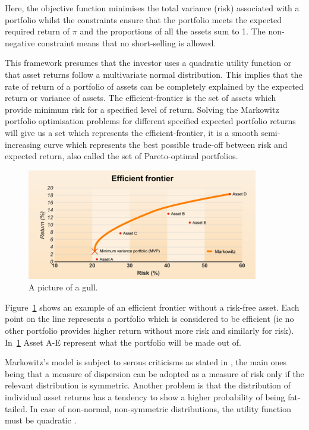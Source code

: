 \documentclass{pdfmx4020}
\begin{document}
    Here, the objective function minimises the total variance (risk) associated with a portfolio whilst the constraints ensure that the portfolio meets the expected required return of $\pi$ and the proportions of all the assets sum to 1. The non-negative constraint means that no short-selling is allowed. 

    This framework presumes that the investor uses a quadratic utility function or that asset returns follow a multivariate normal distribution. This implies that the rate of return of a portfolio of assets can be completely explained by the expected return or variance of assets. The efficient-frontier is the set of assets which provide minimum risk for a specified level of return. Solving the Markowitz portfolio optimisation problems for different specified expected portfolio returns will give us a set which represents the efficient-frontier, it is a smooth semi-increasing curve which represents the best possible trade-off between risk and expected return, also called the set of Pareto-optimal portfolios. 

    \begin{figure}[H]
      \centering
        \includegraphics[width=0.9\textwidth]{efficient_frontier}
      \caption{A picture of a gull.}
      \label{efficient_frontier}
    \end{figure}

    Figure~\ref{efficient_frontier} shows an example of an efficient frontier without a risk-free asset. Each point on the line represents a portfolio which is considered to be efficient (ie no other portfolio provides higher return without more risk and similarly for risk). In~\ref{efficient_frontier} Asset A-E represent what the portfolio will be made out of. 

    Markowitz's model is subject to serous criticisms as stated in \cite{crit}, the main ones being that a measure of dispersion can be adopted as a measure of risk only if the relevant distribution is symmetric. Another problem is that the distribution of individual asset returns has a tendency to show a higher probability of being fat-tailed. In case of non-normal, non-symmetric distributions, the utility function must be quadratic \cite{crit}. 
\end{document}
